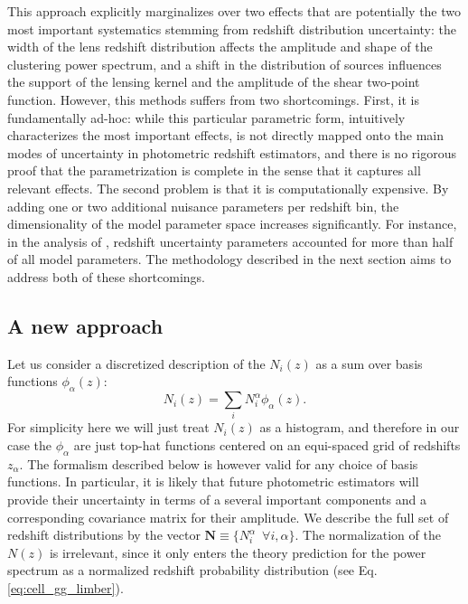 \documentclass[a4paper,11pt]{article}
\newcommand{\vN}{\mathbf{N}}
\begin{document}
      This approach explicitly marginalizes over two effects that are potentially the two most important systematics stemming from redshift distribution uncertainty: the width of the lens redshift distribution affects the amplitude and shape of the clustering power spectrum, and a shift in the distribution of sources influences the support of the lensing kernel and the amplitude of the shear two-point function. However, this methods suffers from two shortcomings. First, it is fundamentally ad-hoc: while this particular parametric form, intuitively characterizes the most important effects, is not directly mapped onto the main modes of uncertainty in photometric redshift estimators, and there is no rigorous proof that the parametrization is complete in the sense that it captures all relevant effects. The second problem is that it is computationally expensive. By adding one or two additional nuisance parameters per redshift bin, the dimensionality of the model parameter space increases significantly. For instance, in the analysis of \cite{1912.08209}, redshift uncertainty parameters accounted for more than half of all model parameters. The methodology described in the next section aims to address both of these shortcomings.

    \subsection{A new approach}\label{ssec:theory.nz_new}
      Let us consider a discretized description of the $N_i(z)$ as a sum over basis functions $\phi_\alpha(z)$:
      \begin{equation}
        N_i(z)=\sum_i N^\alpha_i\phi_\alpha(z).
      \end{equation}
      For simplicity here we will just treat $N_i(z)$ as a histogram, and therefore in our case the $\phi_\alpha$ are just top-hat functions centered on an equi-spaced grid of redshifts $z_\alpha$. The formalism described below is however valid for any choice of basis functions. In particular, it is likely that future photometric estimators will provide their uncertainty in terms of a several important components and a corresponding covariance matrix for their amplitude. We describe the full set of redshift distributions by the vector $\vN\equiv\{N^\alpha_i\,\,\,\forall i,\alpha\}$.  The normalization of the $N(z)$ is irrelevant, since it only enters the theory prediction for the power spectrum as a normalized redshift probability distribution (see Eq. \ref{eq:cell_gg_limber}).
\end{document}

